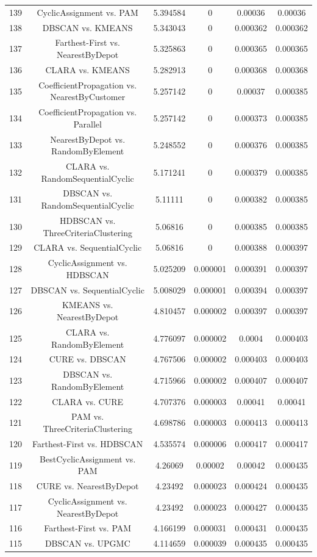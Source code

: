 \documentclass[a4paper,10pt]{article}
\begin{document}
\begin{landscape}
\begin{table}[!htp]
\begin{tabular}{cccccc}
139&CyclicAssignment vs. PAM&5.394584&0&0.00036&0.00036\\
138&DBSCAN vs. KMEANS&5.343043&0&0.000362&0.000362\\
137&Farthest-First vs. NearestByDepot&5.325863&0&0.000365&0.000365\\
136&CLARA vs. KMEANS&5.282913&0&0.000368&0.000368\\
135&CoefficientPropagation vs. NearestByCustomer&5.257142&0&0.00037&0.000385\\
134&CoefficientPropagation vs. Parallel&5.257142&0&0.000373&0.000385\\
133&NearestByDepot vs. RandomByElement&5.248552&0&0.000376&0.000385\\
132&CLARA vs. RandomSequentialCyclic&5.171241&0&0.000379&0.000385\\
131&DBSCAN vs. RandomSequentialCyclic&5.11111&0&0.000382&0.000385\\
130&HDBSCAN vs. ThreeCriteriaClustering&5.06816&0&0.000385&0.000385\\
129&CLARA vs. SequentialCyclic&5.06816&0&0.000388&0.000397\\
128&CyclicAssignment vs. HDBSCAN&5.025209&0.000001&0.000391&0.000397\\
127&DBSCAN vs. SequentialCyclic&5.008029&0.000001&0.000394&0.000397\\
126&KMEANS vs. NearestByDepot&4.810457&0.000002&0.000397&0.000397\\
125&CLARA vs. RandomByElement&4.776097&0.000002&0.0004&0.000403\\
124&CURE vs. DBSCAN&4.767506&0.000002&0.000403&0.000403\\
123&DBSCAN vs. RandomByElement&4.715966&0.000002&0.000407&0.000407\\
122&CLARA vs. CURE&4.707376&0.000003&0.00041&0.00041\\
121&PAM vs. ThreeCriteriaClustering&4.698786&0.000003&0.000413&0.000413\\
120&Farthest-First vs. HDBSCAN&4.535574&0.000006&0.000417&0.000417\\
119&BestCyclicAssignment vs. PAM&4.26069&0.00002&0.00042&0.000435\\
118&CURE vs. NearestByDepot&4.23492&0.000023&0.000424&0.000435\\
117&CyclicAssignment vs. NearestByDepot&4.23492&0.000023&0.000427&0.000435\\
116&Farthest-First vs. PAM&4.166199&0.000031&0.000431&0.000435\\
115&DBSCAN vs. UPGMC&4.114659&0.000039&0.000435&0.000435\\

\end{tabular}
\end{table}
\end{landscape}
\end{document}
